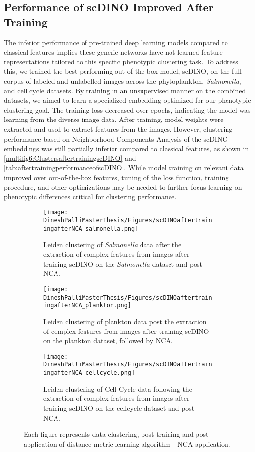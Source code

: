 \documentclass[12pt,a4paper]{article}
\begin{document}

\subsection{Performance of scDINO Improved After Training}

The inferior performance of pre-trained deep learning models compared to classical features implies these generic networks have not learned feature representations tailored to this specific phenotypic clustering task. To address this, we trained the best performing out-of-the-box model, scDINO, on the full corpus of labeled and unlabelled images across the phytoplankton, \textit{Salmonella}, and cell cycle datasets. By training in an unsupervised manner on the combined datasets, we aimed to learn a specialized embedding optimized for our phenotypic clustering goal. The training loss decreased over epochs, indicating the model was learning from the diverse image data. After training, model weights were extracted and used to extract features from the images. However, clustering performance based on Neighborhood Components Analysis of the scDINO embeddings was still partially inferior compared to classical features, as shown in \ref{multifig6:ClustersaftertrainingscDINO} and \ref{tab:aftertrainingperformanceofscDINO}. While model training on relevant data improved over out-of-the-box features, tuning of the loss function, training procedure, and other optimizations may be needed to further focus learning on phenotypic differences critical for clustering performance.


\begin{figure}
  \centering
  \begin{subfigure}{\linewidth}
    \texttt{[image: DineshPalliMasterThesis/Figures/scDINOaftertrainingafterNCA\_salmonella.png]}
    \caption{Leiden clustering of \textit{Salmonella} data after the extraction of complex features from images after training scDINO on the \textit{Salmonella} dataset and post NCA.}
    \label{multifig7:image_a}
  \end{subfigure}
  \hfill
  \begin{subfigure}{\linewidth}
    \texttt{[image: DineshPalliMasterThesis/Figures/scDINOaftertrainingafterNCA\_plankton.png]}
    \caption{Leiden clustering of plankton data post the extraction of complex features from images after training scDINO on the plankton dataset, followed by NCA.}
    \label{multifig7:image_b}
  \end{subfigure}
  \hfill
  \begin{subfigure}{0.3\linewidth}
    \texttt{[image: DineshPalliMasterThesis/Figures/scDINOaftertrainingafterNCA\_cellcycle.png]}
    \caption{Leiden clustering of Cell Cycle data following the extraction of complex features from images after training scDINO on the cellcycle dataset and post NCA.}
    \label{multifig7:image_c}
  \end{subfigure}
  \caption{Each figure represents data clustering, post training and post application of distance metric learning algorithm - NCA application.}
  \label{multifig7:ClustersaftertrainingscDINO}
\end{figure}
\end{document}
